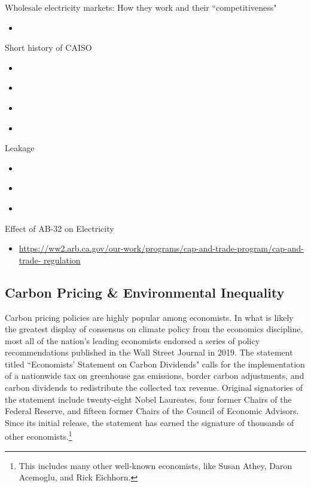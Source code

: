 \noindent Wholesale electricity markets: How they work and their ``competitiveness"
\begin{itemize}
    \item \cite{ferc2020}
\end{itemize}

\noindent Short history of CAISO
\begin{itemize}
    \item \cite{sweeney2013california}
    \item \cite{knittel2005empirical}
    \item \cite{borenstein2000diagnosing}
    \item \cite{borenstein2015us}
\end{itemize}

\noindent Leakage
\begin{itemize}
    \item \cite{burtraw2018}
    \item \cite{fowlie2009incomplete}
    \item \cite{fowlie2021border}
\end{itemize}

\noindent Effect of AB-32 on Electricity
\begin{itemize}
    \item \url{https://ww2.arb.ca.gov/our-work/programs/cap-and-trade-program/cap-and-trade-
    regulation}
\end{itemize}

\subsection{Carbon Pricing \& Environmental Inequality}

Carbon pricing policies are highly popular among economists. In what is likely the greatest display of consensus on climate policy from the economics discipline, most all of the nation's leading economists endorsed a series of policy recommendations published in the Wall Street Journal in 2019. The statement titled ``Economists' Statement on Carbon Dividends" calls for the implementation of a nationwide tax on greenhouse gas emissions, border carbon adjustments, and carbon dividends to redistribute the collected tax revenue. Original signatories of the statement include twenty-eight Nobel Laureates, four former Chairs of the Federal Reserve, and fifteen former Chairs of the Council of Economic Advisors. Since its initial release, the statement has earned the signature of thousands of other economists.\footnote{This includes many other well-known economists, like Susan Athey, Daron Acemoglu, and Rick Eichhorn.}

